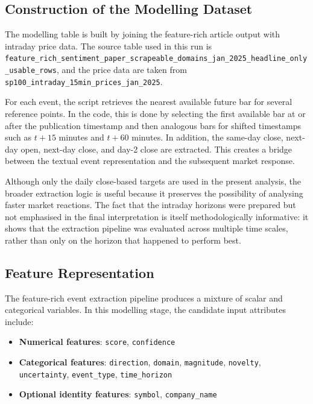 \subsection{Construction of the Modelling Dataset}

The modelling table is built by joining the feature-rich article output with intraday price data. The source table used in this run is
\texttt{feature\_rich\_sentiment\_paper\_scrapeable\_domains\_jan\_2025\_headline\_only\_usable\_rows},
and the price data are taken from
\texttt{sp100\_intraday\_15min\_prices\_jan\_2025}.

For each event, the script retrieves the nearest available future bar for several reference points. In the code, this is done by selecting the first available bar at or after the publication timestamp and then analogous bars for shifted timestamps such as $t+15$ minutes and $t+60$ minutes. In addition, the same-day close, next-day open, next-day close, and day-2 close are extracted. This creates a bridge between the textual event representation and the subsequent market response.

Although only the daily close-based targets are used in the present analysis, the broader extraction logic is useful because it preserves the possibility of analysing faster market reactions. The fact that the intraday horizons were prepared but not emphasised in the final interpretation is itself methodologically informative: it shows that the extraction pipeline was evaluated across multiple time scales, rather than only on the horizon that happened to perform best.

\subsection{Feature Representation}

The feature-rich event extraction pipeline produces a mixture of scalar and categorical variables. In this modelling stage, the candidate input attributes include:
\begin{itemize}
    \item \textbf{Numerical features}: \texttt{score}, \texttt{confidence}
    \item \textbf{Categorical features}: \texttt{direction}, \texttt{domain}, \texttt{magnitude}, \texttt{novelty}, \texttt{uncertainty}, \texttt{event\_type}, \texttt{time\_horizon}
    \item \textbf{Optional identity features}: \texttt{symbol}, \texttt{company\_name}
\end{itemize}

